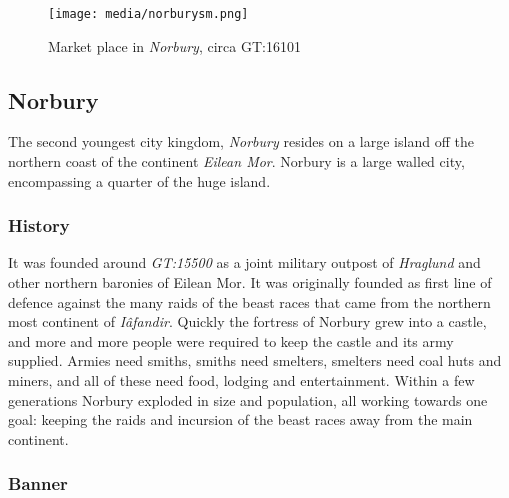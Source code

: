 \begin{figure}[ht!]
  \centering
  \vspace{-2.6cm}
  \centerline{
    \texttt{[image: media/norburysm.png]}
  }
  \par
  Market place in \emph{Norbury}, circa GT:16101
\end{figure}

\subsection{Norbury}


The second youngest city kingdom, \emph{Norbury} resides on a large island off
the northern coast of the continent \emph{Eilean Mor}. Norbury is a large
walled city, encompassing a quarter of the huge island.

\subsubsection*{History}

It was founded around \emph{GT:15500} as a joint military outpost of
\emph{Hraglund} and other northern baronies of Eilean Mor. It was originally
founded as first line of defence against the many raids of the beast races
that came from the northern most continent of \emph{Iâfandir}. Quickly the
fortress of Norbury grew into a castle, and more and more people were
required to keep the castle and its army supplied. Armies need smiths,
smiths need smelters, smelters need coal huts and miners, and all of
these need food, lodging and entertainment. Within a few generations
Norbury exploded in size and population, all working towards one goal:
keeping the raids and incursion of the beast races away from the main
continent.

\subsubsection*{Banner}

